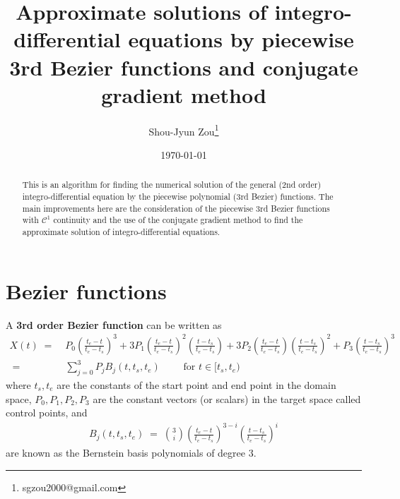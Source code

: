 \documentclass[12pt]{article}
\begin{document}
\title{\fontsize{18}{24} \bf Approximate solutions of integro-differential equations by piecewise 3rd Bezier functions and conjugate gradient method}
\author{\normalsize Shou-Jyun Zou\thanks{sgzou2000@gmail.com}}
\date{\small \today}


\maketitle


\begin{abstract}
	This is an algorithm for finding the numerical solution of the general (2nd order) integro-differential equation by the piecewise polynomial (3rd Bezier) functions.
	The main improvements here are the consideration of the piecewise 3rd Bezier functions with $\mathcal{C}^1$ continuity and the use of the conjugate gradient method to find the approximate solution of integro-differential equations.
\end{abstract}


\tableofcontents





\section{Bezier functions}





A \textbf{3rd order Bezier function} can be written as
%
\begin{align*}
	X(t) \;=\; & P_{0} \left( \frac{t_{e}-t}{t_{e}-t_{s}} \right)^3 + 3 P_{1} \left( \frac{t_{e}-t}{t_{e}-t_{s}} \right)^2 \left( \frac{t-t_{s}}{t_{e}-t_{s}} \right) + 3 P_{2} \left( \frac{t_{e}-t}{t_{e}-t_{s}} \right) \left( \frac{t-t_{s}}{t_{e}-t_{s}} \right)^2 + P_{3} \left( \frac{t-t_{s}}{t_{e}-t_{s}} \right)^3 \\
	\;=\; & \sum_{j=0}^3 P_j B_j(t,t_{s},t_{e}) \qquad \textrm{ for $t\in [t_{s}, t_{e})$}
\end{align*}
%
where $t_{s},t_{e}$ are the constants of the start point and end point in the domain space, $P_0,P_1,P_2,P_3$ are the constant vectors (or scalars) in the target space called control points, and
%
\begin{align*}
	B_j(t,t_{s},t_{e}) \;=\; \binom{3}{i} \left( \frac{t_{e} - t}{t_{e} - t_{s}} \right)^{3-i} \left( \frac{t - t_{s}}{t_{e} - t_{s}} \right)^{i}
\end{align*}
%
are known as the Bernstein basis polynomials of degree $3$.
\end{document}
